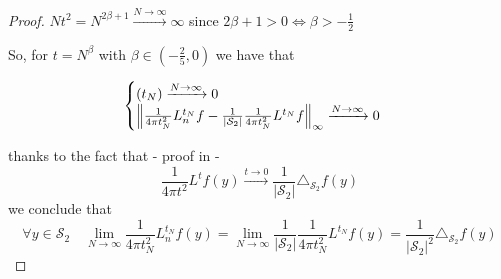 \begin{proof}
	$Nt^2=N^{2\beta+1}\xrightarrow {N \to \infty} \infty$ since $2\beta+1>0 \iff \beta>-\frac{1}{2}$
	
	So, for $t=N^\beta$ with $\beta\in(-\frac{2}{5}, 0)$ we have that 
	
	$$\begin{cases}
	(t_N)\xrightarrow{N\to\infty}0\\
	\left\lVert\frac{1}{4\pi t_N^2}L_n^{t_N}f-\frac{1}{|\mathcal S_2|}\frac{1}{4\pi t_N^2}L^{t_N}f\right\rVert_\infty  \xrightarrow{N\to\infty}0
	\end{cases}$$

	
thanks to the fact that - proof in \cite{Belkin:2005:TTF:2138147.2138189} - 
	$$\frac{1}{4\pi t^2} L^tf(y) \xrightarrow{t\to 0 } \frac{1}{|\mathcal S_2|}\triangle_{\mathcal S_2}f(y)$$
	we conclude that
	$$\forall y\in\mathcal S_2 \quad \lim_{N\to\infty}\frac{1}{4\pi t_N^2} L_n^{t_N}f(y) =  \lim_{N\to\infty}\frac{1}{|\mathcal S_2|}\frac{1}{4\pi t_N^2} L^{t_N}f(y) = \frac{1}{|\mathcal S_2|^2}\triangle_{\mathcal S_2}f(y) $$
\end{proof}
